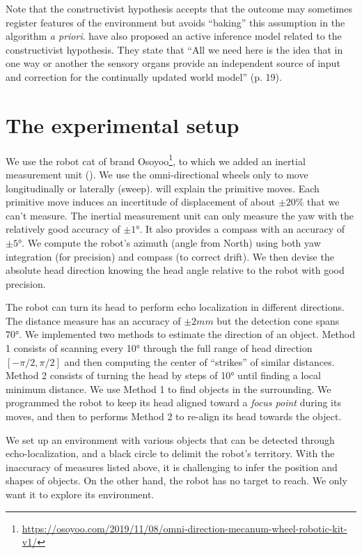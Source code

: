 \documentclass[pmlr]{jmlr}%
\begin{document}
Note that the constructivist hypothesis accepts that the outcome may sometimes register features of the environment but avoids ``baking'' this assumption in the algorithm \textit{a priori}. 
\cite{rudrauf_mathematical_2017} have also proposed an active inference model related to the constructivist hypothesis. They state that ``All we need here is the idea that in one way or another the sensory organs provide an independent source of input and correction for the continually updated world model'' (p. 19).


\section{The experimental setup}
\label{sec:experiment}

We use the robot cat of brand Osoyoo\footnote{\url{https://osoyoo.com/2019/11/08/omni-direction-mecanum-wheel-robotic-kit-v1/}}, to which we added an inertial measurement unit (). 
We use the omni-directional wheels only to move longitudinally or laterally (sweep). 
 will explain the primitive moves. 
Each primitive move induces an incertitude of displacement of about $\pm20\%$ that we can't measure. 
The inertial measurement unit can only measure the yaw with the relatively good accuracy of $\pm1$°.
It also provides a compass with an accuracy of $\pm5$°. 
We compute the robot's azimuth (angle from North) using both yaw integration (for precision) and compass (to correct drift).
We then devise the absolute head direction knowing the head angle relative to the robot with good precision.

The robot can turn its head to perform echo localization in different directions. 
The distance measure has an accuracy of $\pm 2mm$ but the detection cone spans 70°.  
We implemented two methods to estimate the direction of an object. 
Method 1 consists of scanning every 10° through the full range of head direction $[-\pi/2, \pi/2]$ and then computing the center of ``strikes'' of similar distances.
Method 2 consists of turning the head by steps of 10° until finding a local minimum distance.
We use Method 1 to find objects in the surrounding. 
We programmed the robot to keep its head aligned toward a \textit{focus point} during its moves,
and then to performs Method 2 to re-align its head towards the object.

We set up an environment with various objects that can be detected through echo-localization, and a black circle to delimit the robot's territory.
With the inaccuracy of measures listed above, it is challenging to infer the position and shapes of objects. 
On the other hand, the robot has no target to reach. 
We only want it to explore its environment. 
\end{document}
